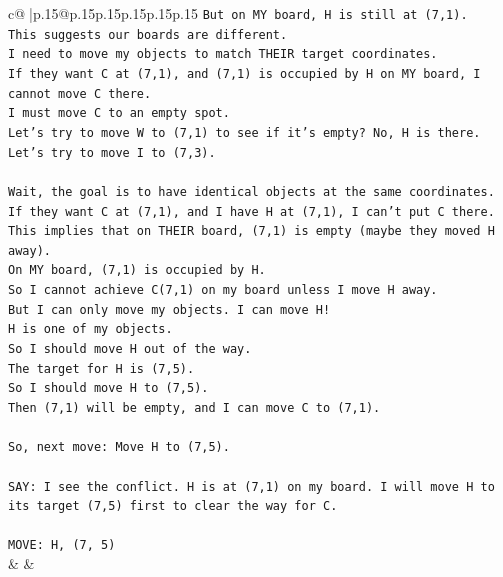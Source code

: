 \documentclass{article}
\begin{document}
{\begin{supertabular}{c@{$\;$}|p{.15\linewidth}@{}p{.15\linewidth}p{.15\linewidth}p{.15\linewidth}p{.15\linewidth}p{.15\linewidth}}
{{{\texttt{But on MY board, H is still at (7,1).} \\
\texttt{This suggests our boards are different.} \\
\texttt{I need to move my objects to match THEIR target coordinates.} \\
\texttt{If they want C at (7,1), and (7,1) is occupied by H on MY board, I cannot move C there.} \\
\texttt{I must move C to an empty spot.} \\
\texttt{Let's try to move W to (7,1) to see if it's empty? No, H is there.} \\
\texttt{Let's try to move I to (7,3).} \\
\\ 
\texttt{Wait, the goal is to have identical objects at the same coordinates.} \\
\texttt{If they want C at (7,1), and I have H at (7,1), I can't put C there.} \\
\texttt{This implies that on THEIR board, (7,1) is empty (maybe they moved H away).} \\
\texttt{On MY board, (7,1) is occupied by H.} \\
\texttt{So I cannot achieve C(7,1) on my board unless I move H away.} \\
\texttt{But I can only move my objects. I can move H!} \\
\texttt{H is one of my objects.} \\
\texttt{So I should move H out of the way.} \\
\texttt{The target for H is (7,5).} \\
\texttt{So I should move H to (7,5).} \\
\texttt{Then (7,1) will be empty, and I can move C to (7,1).} \\
\\ 
\texttt{So, next move: Move H to (7,5).} \\
\\ 
\texttt{SAY: I see the conflict. H is at (7,1) on my board. I will move H to its target (7,5) first to clear the way for C.} \\
\\ 
\texttt{MOVE: H, (7, 5)} \\
            }
        }
    }
    & & \\ \\


\end{supertabular}}
\end{document}
